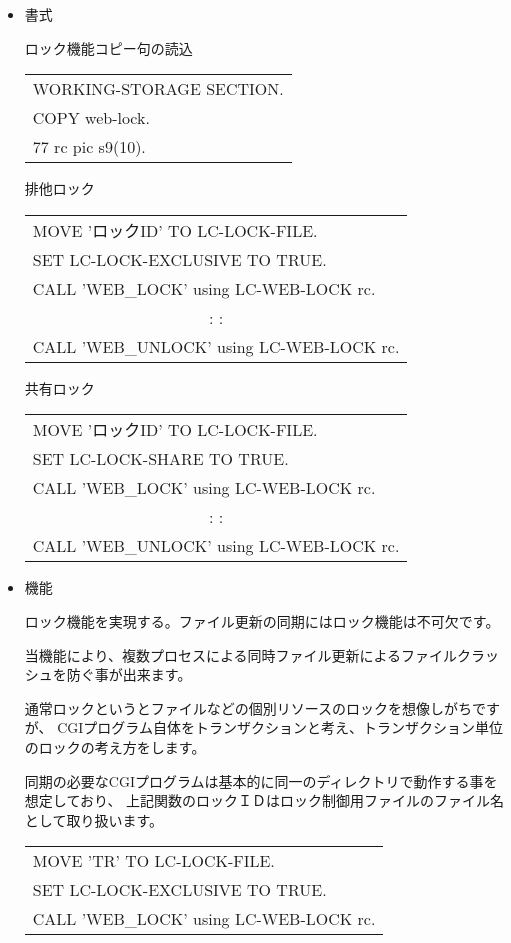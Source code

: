 
\begin{itemize}
\item{書式}

{\gt ロック機能コピー句の読込}

\begin{tabular}{|l|}
\hline
WORKING-STORAGE SECTION.\\
COPY web-lock.\\
77  rc  pic s9(10).\\
\hline
\end{tabular}

{\gt 排他ロック}

\begin{tabular}{|l|}
\hline
MOVE 'ロックID' TO LC-LOCK-FILE.\\
SET LC-LOCK-EXCLUSIVE   TO TRUE.\\
CALL 'WEB\_LOCK' using LC-WEB-LOCK rc.\\
\multicolumn{1}{|c|}{: :}\\
CALL 'WEB\_UNLOCK' using LC-WEB-LOCK rc.\\
\hline
\end{tabular}

{\gt 共有ロック}

\begin{tabular}{|l|}
\hline
MOVE 'ロックID' TO LC-LOCK-FILE.\\
SET LC-LOCK-SHARE       TO TRUE.\\
CALL 'WEB\_LOCK' using LC-WEB-LOCK rc.\\
\multicolumn{1}{|c|}{: :}\\
CALL 'WEB\_UNLOCK' using LC-WEB-LOCK rc.\\
\hline
\end{tabular}

\item{機能}

ロック機能を実現する。ファイル更新の同期にはロック機能は不可欠です。

当機能により、複数プロセスによる同時ファイル更新によるファイルクラッシュを防ぐ事が出来ます。

通常ロックというとファイルなどの個別リソースのロックを想像しがちですが、
CGIプログラム自体をトランザクションと考え、トランザクション単位のロックの考え方をします。

同期の必要なCGIプログラムは基本的に同一のディレクトリで動作する事を想定しており、
上記関数のロックＩＤはロック制御用ファイルのファイル名として取り扱います。

{\footnotesize
\begin{tabular}{|l|}
\hline
MOVE 'TR' TO LC-LOCK-FILE.      \\
SET LC-LOCK-EXCLUSIVE TO TRUE.  \\
CALL 'WEB\_LOCK' using LC-WEB-LOCK rc.\\
\hline
\end{tabular}
}


\end{itemize}
